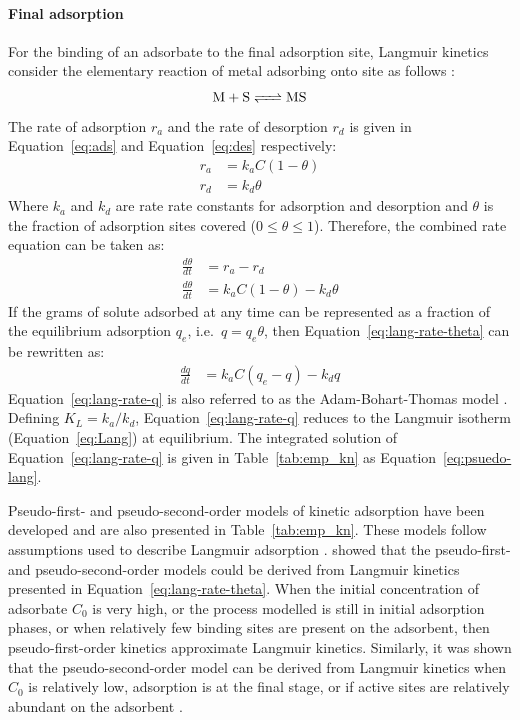 \paragraph{Final adsorption}For the binding of an adsorbate to the final adsorption site, Langmuir kinetics consider the elementary reaction of metal  adsorbing onto site  as follows \parencite{Fogler2006}:
\begin{equation}
\ce{M + S <=> MS}
\end{equation}
The rate of adsorption $ r_a $ and the rate of desorption $ r_d $ is given in Equation~\ref{eq:ads} and Equation~\ref{eq:des} respectively:
\begin{align}
r_a &= k_aC(1 - \theta) \label{eq:ads} \\
r_d &= k_d \theta \label{eq:des}
\end{align}
Where $ k_a $ and $ k_d $ are rate rate constants for adsorption and desorption and $ \theta $ is the fraction of adsorption sites covered ($ 0 \le \theta \le 1 $). Therefore, the combined rate equation can be taken as:
\begin{align}
	\frac{d\theta}{dt} &= r_a - r_d\\
	\frac{d\theta}{dt}&= k_aC(1 - \theta) - k_d \theta \label{eq:lang-rate-theta}
\end{align}
If the grams of solute adsorbed at any time can be represented as a fraction of the equilibrium adsorption $ q_e $, i.e.\  $q =  q_e \theta$, then Equation~\ref{eq:lang-rate-theta} can be rewritten as:
\begin{align}
	\frac{dq}{dt}&= k_aC(q_e - q) - k_d q \label{eq:lang-rate-q}
\end{align}
Equation~\ref{eq:lang-rate-q} is also referred to as the Adam-Bohart-Thomas model \parencite{Zhao2011}. Defining $ K_L = k_a/k_d $,  Equation~\ref{eq:lang-rate-q} reduces to the Langmuir isotherm (Equation~\ref{eq:Lang}) at equilibrium. The integrated solution of Equation~\ref{eq:lang-rate-q} is given in Table~\ref{tab:emp_kn} as Equation~\ref{eq:psuedo-lang}. 

Pseudo-first- and pseudo-second-order models of kinetic adsorption have been developed and are also presented in Table~\ref{tab:emp_kn}. These models follow assumptions used to describe Langmuir adsorption \parencite{Largitte2016,Ho2000}. \textcite{Azizian2004} showed that the pseudo-first- and pseudo-second-order models could be derived from Langmuir kinetics presented in Equation~\ref{eq:lang-rate-theta}.  When the initial concentration of adsorbate $ C_0 $ is very high, or the process modelled is still in initial adsorption phases, or when relatively few binding sites are present on the adsorbent, then pseudo-first-order kinetics approximate Langmuir kinetics. Similarly, it was shown that the pseudo-second-order model can be derived from Langmuir kinetics when $ C_0 $ is relatively low, adsorption is at the final stage, or if active sites are relatively abundant on the adsorbent  \parencite{Wang2020}. 


